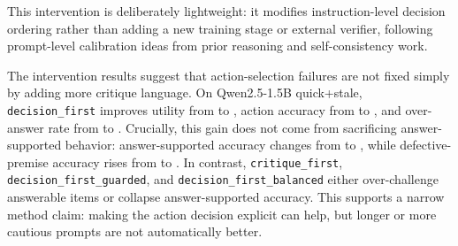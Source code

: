 

This intervention is deliberately lightweight: it modifies instruction-level decision ordering rather than adding a new training stage or external verifier, following prompt-level calibration ideas from prior reasoning and self-consistency work\citep{wei-etal-2022-chain-of-thought,wang-etal-2023-self-consistency,madaan-etal-2023-self-refine}.

The intervention results suggest that action-selection failures are not fixed simply by adding more critique language. On Qwen2.5-1.5B quick+stale, \texttt{decision\_first} improves utility from \QwenQuickStaleInterventionBaselineUtility{} to \QwenQuickStaleInterventionDecisionFirstUtility{}, action accuracy from \QwenQuickStaleInterventionBaselineActionAcc{} to \QwenQuickStaleInterventionDecisionFirstActionAcc{}, and over-answer rate from \QwenQuickStaleInterventionBaselineOverAnswer{} to \QwenQuickStaleInterventionDecisionFirstOverAnswer{}. Crucially, this gain does not come from sacrificing answer-supported behavior: answer-supported accuracy changes from \QwenQuickStaleInterventionBaselineAnswerSupportedAcc{} to \QwenQuickStaleInterventionDecisionFirstAnswerSupportedAcc{}, while defective-premise accuracy rises from \QwenQuickStaleInterventionBaselineDefectivePremiseAcc{} to \QwenQuickStaleInterventionDecisionFirstDefectivePremiseAcc{}. In contrast, \texttt{critique\_first}, \texttt{decision\_first\_guarded}, and \texttt{decision\_first\_balanced} either over-challenge answerable items or collapse answer-supported accuracy. This supports a narrow method claim: making the action decision explicit can help, but longer or more cautious prompts are not automatically better.
